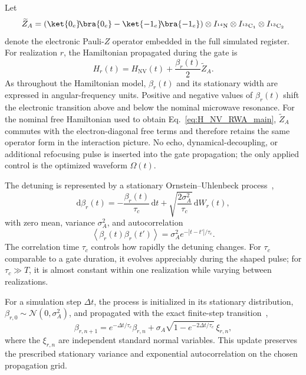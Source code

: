 \documentclass[
  aps,
  pra,
  reprint,            %
  superscriptaddress, %
  amsmath,amssymb,
  notitlepage
]{revtex4-2}
\begin{document}
Let
\begin{equation}
\widetilde Z_A
=
\left(\ket{0_e}\!\bra{0_e}-\ket{-1_e}\!\bra{-1_e}\right)
\otimes I_{^{14}\mathrm N}
\otimes I_{^{13}\mathrm C_1}
\otimes I_{^{13}\mathrm C_2}
\label{eq:embedded_electron_z}
\end{equation}
denote the electronic Pauli-$Z$ operator embedded in the full simulated register. For realization $r$, the Hamiltonian propagated during the gate is
\begin{equation}
\boxed{
H_r(t)
=
H_{\mathrm{NV}}(t)
+
\frac{\beta_r(t)}{2}\widetilde Z_A .
}
\label{eq:noisy_full_hamiltonian}
\end{equation}
As throughout the Hamiltonian model, $\beta_r(t)$ and its stationary width are expressed in angular-frequency units. Positive and negative values of $\beta_r(t)$ shift the electronic transition above and below the nominal microwave resonance. For the nominal free Hamiltonian used to obtain Eq.~\eqref{eq:H_NV_RWA_main}, $\widetilde Z_A$ commutes with the electron-diagonal free terms and therefore retains the same operator form in the interaction picture. No echo, dynamical-decoupling, or additional refocusing pulse is inserted into the gate propagation; the only applied control is the optimized waveform $\Omega(t)$.

The detuning is represented by a stationary Ornstein--Uhlenbeck process~\cite{UhlenbeckOrnstein1930},
\begin{equation}
\mathrm d\beta_r(t)
=
-\frac{\beta_r(t)}{\tau_c}\,\mathrm dt
+
\sqrt{\frac{2\sigma_A^2}{\tau_c}}\,\mathrm dW_r(t),
\label{eq:ou_sde}
\end{equation}
with zero mean, variance $\sigma_A^2$, and autocorrelation
\begin{equation}
\left\langle\beta_r(t)\beta_r(t')\right\rangle
=
\sigma_A^2e^{-|t-t'|/\tau_c}.
\label{eq:ou_correlation}
\end{equation}
The correlation time $\tau_c$ controls how rapidly the detuning changes. For $\tau_c$ comparable to a gate duration, it evolves appreciably during the shaped pulse; for $\tau_c\gg T$, it is almost constant within one realization while varying between realizations.

For a simulation step $\Delta t$, the process is initialized in its stationary distribution, $\beta_{r,0}\sim\mathcal N(0,\sigma_A^2)$, and propagated with the exact finite-step transition~\cite{gillespie1996ou},
\begin{equation}
\beta_{r,n+1}
=
e^{-\Delta t/\tau_c}\beta_{r,n}
+
\sigma_A\sqrt{1-e^{-2\Delta t/\tau_c}}\,\xi_{r,n},
\label{eq:ou_exact_discrete}
\end{equation}
where the $\xi_{r,n}$ are independent standard normal variables. This update preserves the prescribed stationary variance and exponential autocorrelation on the chosen propagation grid.
\end{document}
